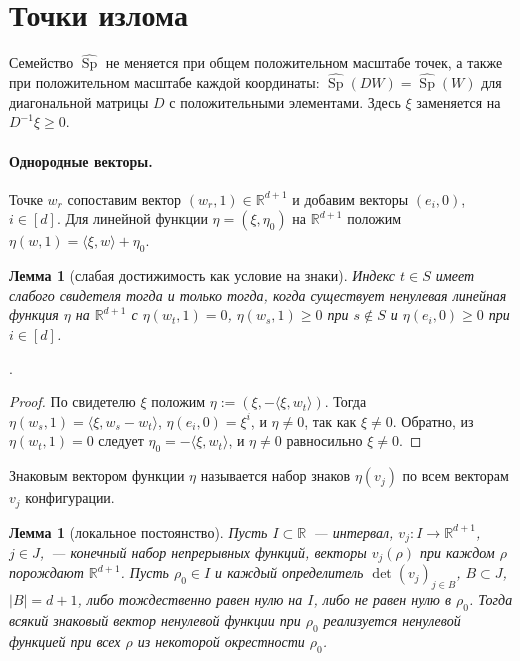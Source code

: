 \documentclass[a4paper,11pt]{article}
\newcommand{\lean}[1]{\mbox{\path{#1}}} %
\theoremstyle{plain}
\newtheorem{lemma}[theorem]{Лемма}
\theoremstyle{definition}
\theoremstyle{remark}
\newcommand{\R}{\mathbb{R}}
\newcommand{\abs}[1]{\left\lvert #1 \right\rvert}
\newcommand{\ip}[2]{\langle #1, #2\rangle} %
\DeclareMathOperator{\Sp}{Sp}
\begin{document}
\section{Точки излома}

Семейство $\widehat{\Sp}$ не меняется при общем положительном масштабе точек, а также при положительном масштабе каждой координаты: $\widehat{\Sp}(D W)=\widehat{\Sp}(W)$ для диагональной матрицы $D$ с положительными элементами. Здесь $\xi$ заменяется на $D^{-1}\xi\ge0$.

\paragraph{Однородные векторы.} Точке $w_r$ сопоставим вектор $(w_r,1)\in\R^{d+1}$ и добавим векторы $(e_i,0)$, $i\in[d]$. Для линейной функции $\eta=(\xi,\eta_0)$ на $\R^{d+1}$ положим $\eta(w,1)=\ip{\xi}{w}+\eta_0$.

\begin{lemma}[слабая достижимость как условие на знаки]\label{lem:signs}
    Индекс $t\in S$ имеет слабого свидетеля тогда и только тогда, когда существует ненулевая линейная функция $\eta$ на $\R^{d+1}$ с $\eta(w_t,1)=0$, $\eta(w_s,1)\ge0$ при $s\notin S$ и $\eta(e_i,0)\ge0$ при $i\in[d]$.
\end{lemma}

\lean{witness_iff_homogeneous}.

\begin{proof}
    По свидетелю $\xi$ положим $\eta:=(\xi,-\ip{\xi}{w_t})$. Тогда $\eta(w_s,1)=\ip{\xi}{w_s-w_t}$, $\eta(e_i,0)=\xi^i$, и $\eta\ne0$, так как $\xi\ne0$. Обратно, из $\eta(w_t,1)=0$ следует $\eta_0=-\ip{\xi}{w_t}$, и $\eta\ne0$ равносильно $\xi\ne0$.
\end{proof}

Знаковым вектором функции $\eta$ называется набор знаков $\eta(v_j)$ по всем векторам $v_j$ конфигурации.

\begin{lemma}[локальное постоянство]\label{lem:local}
    Пусть $I\subset\R$~--- интервал, $v_j:I\to\R^{d+1}$, $j\in J$,~--- конечный набор непрерывных функций, векторы $v_j(\rho)$ при каждом $\rho$ порождают $\R^{d+1}$. Пусть $\rho_0\in I$ и каждый определитель $\det(v_j)_{j\in B}$, $B\subset J$, $\abs{B}=d+1$, либо тождественно равен нулю на $I$, либо не равен нулю в $\rho_0$. Тогда всякий знаковый вектор ненулевой функции при $\rho_0$ реализуется ненулевой функцией при всех $\rho$ из некоторой окрестности $\rho_0$.
\end{lemma}
\end{document}
